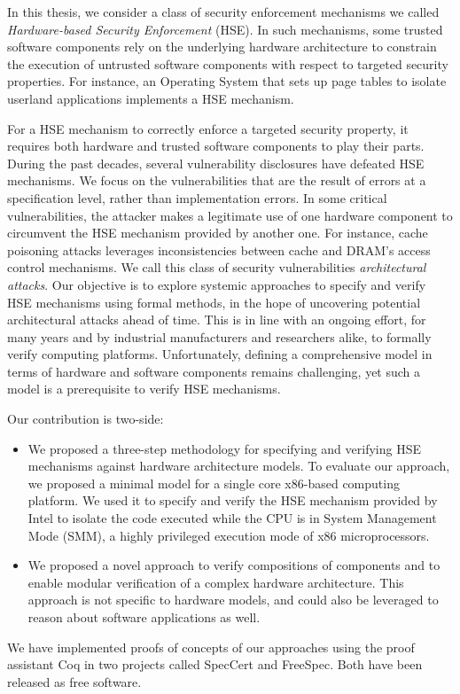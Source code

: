 In this thesis, we consider a class of security enforcement mechanisms we called
\emph{Hardware-based Security Enforcement} (HSE).
%
In such mechanisms, some trusted software components rely on the underlying
hardware architecture to constrain the execution of untrusted software
components with respect to targeted security properties.
%
For instance, an Operating System that sets up page tables to isolate userland
applications implements a HSE mechanism.

For a HSE mechanism to correctly enforce a targeted security property, it
requires both hardware and trusted software components to play their parts.
%
During the past decades, several vulnerability disclosures have defeated HSE
mechanisms.
%
We focus on the vulnerabilities that are the result of errors at a specification
level, rather than implementation errors.
%
In some critical vulnerabilities, the attacker makes a legitimate use of one
hardware component to circumvent the HSE mechanism provided by another
one.
%
For instance, cache poisoning attacks leverages inconsistencies between cache
and DRAM's access control mechanisms.
%
We call this class of security vulnerabilities \emph{architectural attacks}.
%
Our objective is to explore systemic approaches to specify and verify HSE
mechanisms using formal methods, in the hope of uncovering potential
architectural attacks ahead of time.
%
This is in line with an ongoing effort, for many years and by industrial
manufacturers and researchers alike, to formally verify computing platforms.
%
Unfortunately, defining a comprehensive model in terms of hardware and software
components remains challenging, yet such a model is a prerequisite to verify HSE
mechanisms.

Our contribution is two-side:
%
\begin{itemize}
\item We proposed a three-step methodology for specifying and verifying HSE
  mechanisms against hardware architecture models.
  To evaluate our approach, we proposed a minimal model for a single core
  x86-based computing platform.
  We used it to specify and verify the HSE mechanism provided by Intel to
  isolate the code executed while the CPU is in System Management Mode (SMM), a
  highly privileged execution mode of x86 microprocessors.
\item We proposed a novel approach to verify compositions of components and to
  enable modular verification of a complex hardware architecture.
  This approach is not specific to hardware models, and could also be leveraged
  to reason about software applications as well.
\end{itemize}
%
We have implemented proofs of concepts of our approaches using the proof
assistant Coq in two projects called SpecCert and FreeSpec. Both have been
released as free software.
